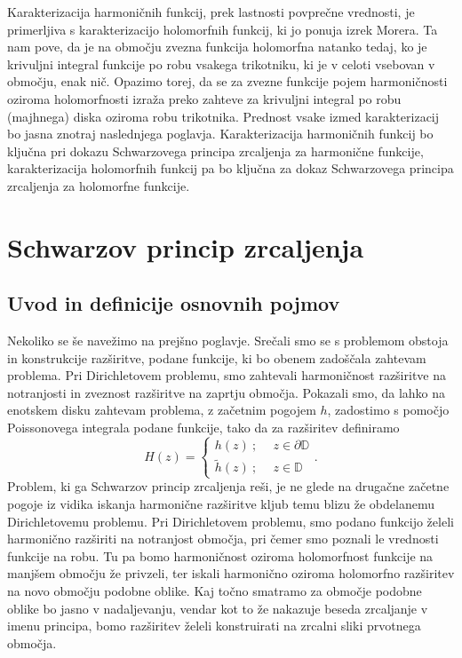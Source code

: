 \documentclass[mat1, tisk]{fmfdelo}
\begin{document}
    \begin{opomba}
        \label{karakterizacija}
        Karakterizacija harmoničnih funkcij, prek lastnosti povprečne vrednosti, je primerljiva s karakterizacijo holomorfnih funkcij, ki jo ponuja izrek Morera. 
        Ta nam pove, da je na območju zvezna funkcija holomorfna natanko tedaj, ko je krivuljni integral funkcije po robu vsakega trikotniku, ki je v celoti vsebovan v območju, enak nič.
        Opazimo torej, da se za zvezne funkcije pojem harmoničnosti oziroma holomorfnosti izraža preko zahteve za krivuljni integral po robu (majhnega) diska oziroma robu trikotnika.
        Prednost vsake izmed karakterizacij bo jasna znotraj naslednjega poglavja. Karakterizacija harmoničnih funkcij bo ključna pri dokazu Schwarzovega principa zrcaljenja za harmonične funkcije, 
        karakterizacija holomorfnih funkcij pa bo ključna za dokaz Schwarzovega principa zrcaljenja za holomorfne funkcije. 
    \end{opomba}

\section{Schwarzov princip zrcaljenja}
\subsection{Uvod in definicije osnovnih pojmov}
    Nekoliko se še navežimo na prejšno poglavje. 
    Srečali smo se s problemom obstoja in konstrukcije razširitve, podane funkcije, ki bo obenem zadoščala zahtevam problema.  
    Pri Dirichletovem problemu, smo zahtevali harmoničnost razširitve na notranjosti in zveznost razširitve na zaprtju območja. 
    Pokazali smo, da lahko na enotskem disku zahtevam problema, z začetnim pogojem $h$, zadostimo s pomočjo Poissonovega integrala podane funkcije, tako da za razširitev definiramo
    $$
        H(z) = 
        \begin{cases}
            h(z)~;~~&z \in \partial \mathbb{D} \\
            \widetilde{h}(z)~;~~&z \in \mathbb{D}
        \end{cases}.
    $$
    Problem, ki ga Schwarzov princip zrcaljenja reši, je ne glede na drugačne začetne pogoje iz vidika iskanja harmonične razširitve kljub temu blizu že obdelanemu Dirichletovemu problemu.
    Pri Dirichletovem problemu, smo podano funkcijo želeli harmonično razširiti na notranjost območja, pri čemer smo poznali le vrednosti funkcije na robu. Tu pa bomo harmoničnost oziroma holomorfnost funkcije na manjšem območju že privzeli, ter iskali harmonično oziroma holomorfno razširitev na novo območju podobne oblike.
    Kaj točno smatramo za območje podobne oblike bo jasno v nadaljevanju, vendar kot to že nakazuje beseda zrcaljanje v imenu principa, bomo razširitev želeli konstruirati na zrcalni sliki prvotnega območja. 
    
\end{document}
